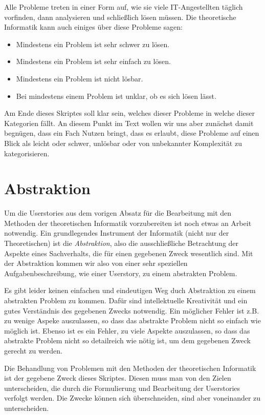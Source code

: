 Alle Probleme treten in einer Form auf,
wie sie viele IT-Angestellten täglich vorfinden, dann analysieren und schließlich lösen müssen.
Die theoretische Informatik kann auch einiges über diese Probleme sagen:
\begin{itemize}
    \item Mindestens ein Problem ist sehr schwer zu lösen.
    \item Mindestens ein Problem ist sehr einfach zu lösen.
    \item Mindestens ein Problem ist nicht lösbar.
    \item Bei mindestens einem Problem ist unklar, ob es sich lösen lässt.
\end{itemize}

Am Ende dieses Skriptes soll klar sein, welches dieser Probleme in welche dieser Kategorien fällt.
An diesem Punkt im Text wollen wir uns aber zunächst damit begnügen,
dass ein Fach Nutzen bringt, dass es erlaubt, diese Probleme auf einen Blick als leicht oder
schwer, unlösbar oder von unbekannter Komplexität zu kategorisieren.

\section{Abstraktion}

Um die Userstories aus dem vorigen Absatz für die Bearbeitung mit den Methoden der
theoretischen Informatik vorzubereiten ist noch etwas an Arbeit notwendig.
Ein grundlegendes Instrument der Informatik (nicht nur der Theoretischen) 
ist die \emph{Abstraktion}, also die ausschließliche Betrachtung der Aspekte eines Sachverhalts,
die für einen gegebenen Zweck wesentlich sind.
Mit der Abstraktion kommen wir also von einer sehr speziellen Aufgabenbeschreibung,
wie einer Userstory, zu einem abstrakten Problem.

Es gibt leider keinen einfachen und eindeutigen Weg
duch Abstraktion zu einem abstrakten Problem zu kommen.
Dafür sind intellektuelle Kreativität und ein gutes Verständnis des gegebenen Zwecks notwendig.
Ein möglicher Fehler ist z.B. zu wenige Aspeke auszulassen,
so dass das abstrakte Problem nicht so einfach wie möglich ist. 
Ebenso ist es ein Fehler, zu viele Aspekte auszulassen,
so dass das abstrakte Problem nicht so detailreich wie nötig ist,
um dem gegebenen Zweck gerecht zu werden.

Die Behandlung von Problemen mit den Methoden der theoretischen Informatik
ist der gegebene Zweck dieses Skriptes. 
Diesen muss man von den Zielen unterscheiden,
die durch die Formulierung und Bearbeitung der Userstories verfolgt werden.
Die Zwecke können sich überschneiden, sind aber voneinander zu unterscheiden.\\

